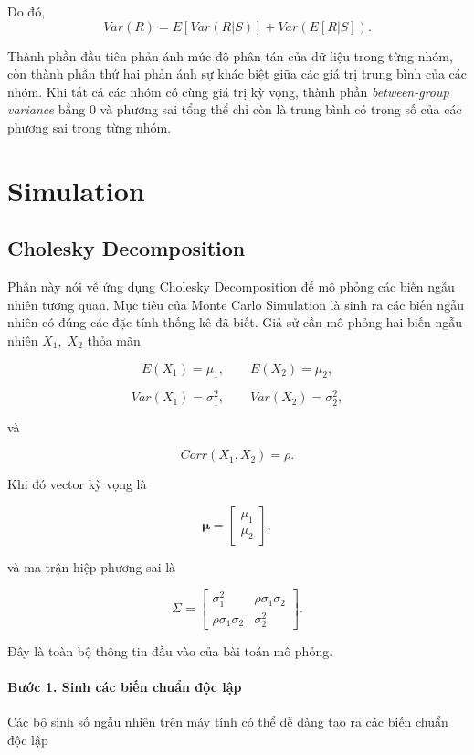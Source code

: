 Do đó,
\[
\boxed{
Var(R)
=
E[Var(R|S)]
+
Var(E[R|S]).
}
\]

Thành phần đầu tiên phản ánh mức độ phân tán của dữ liệu trong từng nhóm, còn thành phần thứ hai phản ánh sự khác biệt giữa các giá trị trung bình của các nhóm. Khi tất cả các nhóm có cùng giá trị kỳ vọng, thành phần \textit{between-group variance} bằng 0 và phương sai tổng thể chỉ còn là trung bình có trọng số của các phương sai trong từng nhóm.

\chapter{Simulation}
\label{chap:Simulation}

\section{Cholesky Decomposition}
\label{sec:Cholesky_Decomposition}

Phần này nói về ứng dụng Cholesky Decomposition để mô phỏng các biến ngẫu nhiên tương quan. Mục tiêu của Monte Carlo Simulation là sinh ra các biến ngẫu nhiên có đúng các đặc tính thống kê đã biết. 
Giả sử cần mô phỏng hai biến ngẫu nhiên $X_1,\;X_2$ thỏa mãn

\[
E(X_1)=\mu_1,\qquad
E(X_2)=\mu_2,
\]

\[
Var(X_1)=\sigma_1^2,\qquad
Var(X_2)=\sigma_2^2,
\]

và

\[
Corr(X_1,X_2)=\rho.
\]

Khi đó vector kỳ vọng là

\[
\boldsymbol{\mu}
=
\begin{bmatrix}
\mu_1\\
\mu_2
\end{bmatrix},
\]

và ma trận hiệp phương sai là

\[
\Sigma
=
\begin{bmatrix}
\sigma_1^2 &
\rho\sigma_1\sigma_2
\\
\rho\sigma_1\sigma_2 &
\sigma_2^2
\end{bmatrix}.
\]

Đây là toàn bộ thông tin đầu vào của bài toán mô phỏng.

\subsubsection*{Bước 1. Sinh các biến chuẩn độc lập}

Các bộ sinh số ngẫu nhiên trên máy tính có thể dễ dàng tạo ra các biến chuẩn độc lập


